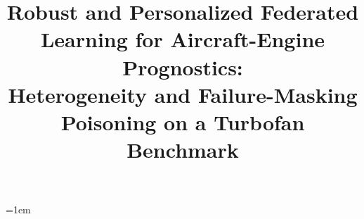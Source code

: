 \documentclass[a4paper,fleqn,doubleblind]{cas-sc}
\begin{document}
\let\WriteBookmarks\relax

\renewcommand{\topfraction}{0.85}
\renewcommand{\bottomfraction}{0.70}
\renewcommand{\textfraction}{0.10}
\renewcommand{\floatpagefraction}{0.75}
\setcounter{topnumber}{3}
\setcounter{bottomnumber}{2}
\setcounter{totalnumber}{5}

\emergencystretch=1em


\title[mode = title]{Robust and Personalized Federated Learning for
Aircraft-Engine Prognostics:\texorpdfstring{\\}{ }
Heterogeneity and Failure-Masking Poisoning on a Turbofan Benchmark}

\end{document}
